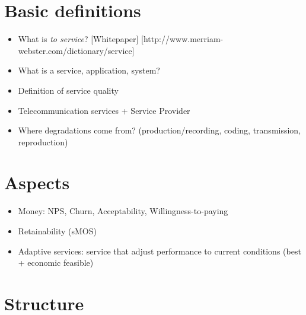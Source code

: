 \section{Basic definitions}
\begin{itemize}
\item What is \emph{to service}? [Whitepaper] [http://www.merriam-webster.com/dictionary/service]
\item What is a service, application, system?
\item Definition of service quality
\item Telecommunication services + Service Provider
\item Where degradations come from? (production/recording, coding, transmission, reproduction)
\end{itemize}

\section{Aspects}
\begin{itemize}
\item Money: NPS, Churn, Acceptability, Willingness-to-paying
\item Retainability (sMOS)
\item Adaptive services: service that adjust performance to current conditions (best + economic feasible)
\end{itemize}

\section{Structure}
